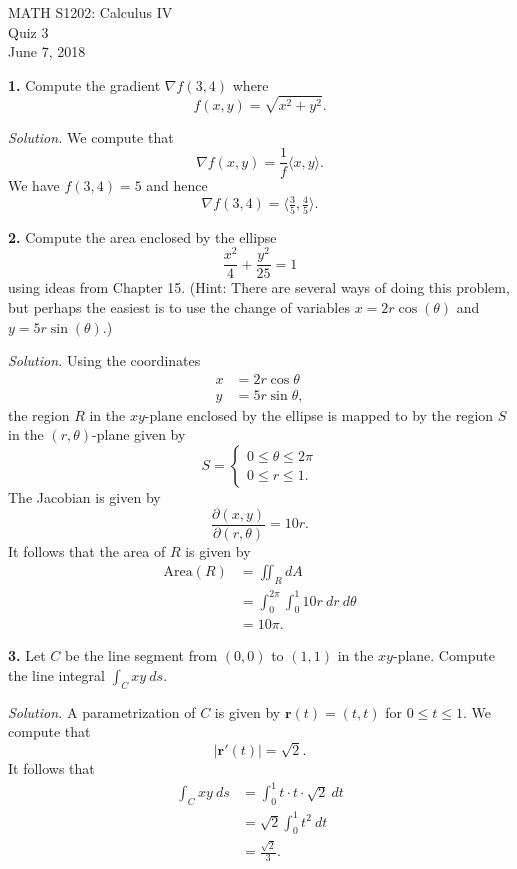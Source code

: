 \documentclass{article}
\begin{document}
\begin{center}
MATH S1202: Calculus IV \\ 
Quiz 3 \\
June 7, 2018
\end{center}


\noindent \textbf{1.} Compute the gradient $\nabla f(3,4)$ where 
\[
f(x,y) = \sqrt{x^2 + y^2}.
\]

\medskip

{\color{blue}
\noindent \emph{Solution.} We compute that 
\[
\nabla f(x,y) = \frac{1}{f} \langle x,y\rangle.
\]
We have $f(3,4) = 5$ and hence 
\[
\nabla f(3,4) = \langle \tfrac{3}{5}, \tfrac{4}{5} \rangle.
\]
}

\vspace{3mm}

\noindent \textbf{2.} Compute the area enclosed by the ellipse 
\[
\frac{x^2}{4} + \frac{y^2}{25} = 1
\]
using ideas from Chapter 15. (Hint: There are several ways of doing this problem, but perhaps the easiest is to use the change of variables $x = 2 r \cos(\theta)$ and $y = 5 r \sin(\theta)$.)


\medskip

{\color{blue}
\noindent \emph{Solution.} Using the coordinates 
\begin{align*}
x &= 2r \cos\theta \\
y &= 5r \sin\theta,
\end{align*}
the region $R$ in the $xy$-plane enclosed by the ellipse is mapped to by the region $S$ in the $(r,\theta)$-plane given by 
\[
S = \begin{cases}
0 \leqslant \theta \leqslant 2\pi \\
0 \leqslant r \leqslant 1.
\end{cases}
\]
The Jacobian is given by 
\[
\frac{\partial(x,y)}{\partial(r, \theta)} = 10r.
\]
It follows that the area of $R$ is given by 
\begin{align*}
\text{Area}(R) &= \iint_R dA \\
&= \int_0^{2\pi}\int_0^1 10r \: dr \: d\theta \\
&= 10 \pi.
\end{align*}
}

\vspace{3mm}

\noindent \textbf{3.} Let $C$ be the line segment from $(0,0)$ to $(1,1)$ in the $xy$-plane. Compute the line integral $\int_C xy \: ds$. 


\medskip

{\color{blue}
\noindent \emph{Solution.} A parametrization of $C$ is given by $\mathbf{r}(t) = (t,t)$ for $0 \leqslant t \leqslant 1$. We compute that 
\[
|\mathbf{r}'(t)| = \sqrt{2}.
\]
It follows that 
\begin{align*}
\int_C xy \: ds &= \int_0^1 t \cdot t \cdot \sqrt{2} \: dt \\
&= \sqrt{2}\int_0^1 t^2 \: dt \\
&= \frac{\sqrt{2}}{3}.
\end{align*}
}
\end{document}
